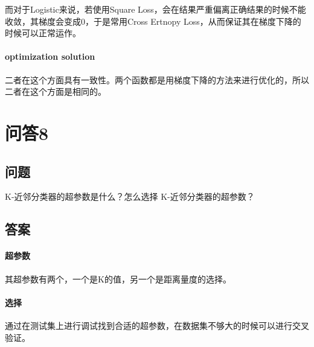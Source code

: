 \documentclass[UTF8]{ctexart}
\begin{document}
而对于Logistic来说，若使用Square Loss，会在结果严重偏离正确结果的时候不能收敛，其梯度会变成0，于是常用Cross Ertnopy Loss，从而保证其在梯度下降的时候可以正常运作。

\paragraph{optimization solution}
二者在这个方面具有一致性。两个函数都是用梯度下降的方法来进行优化的，所以二者在这个方面是相同的。


\section{问答8}
\subsection{问题}
K-近邻分类器的超参数是什么？怎么选择 K-近邻分类器的超参数？
\subsection{答案}
\paragraph{超参数}其超参数有两个，一个是K的值，另一个是距离量度的选择。
\paragraph{选择}通过在测试集上进行调试找到合适的超参数，在数据集不够大的时候可以进行交叉验证。
\end{document}
